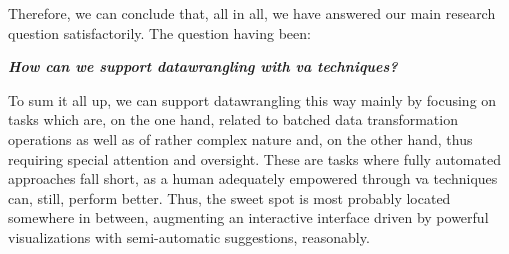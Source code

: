 Therefore, we can conclude that, all in all, we have answered our main research question satisfactorily.
The question having been:

\emph{\textbf{How can we support \gls{datawrangling} with \gls{va} techniques?}}

To sum it all up, we can support \gls{datawrangling} this way mainly by focusing on tasks which are, on the one hand, related to batched data transformation operations as well as of rather complex nature and, on the other hand, thus requiring special attention and oversight.
These are tasks where fully automated approaches fall short, as a human adequately empowered through \gls{va} techniques can, still, perform better.
Thus, the sweet spot is most probably located somewhere in between, augmenting an interactive interface driven by powerful visualizations with semi-automatic suggestions, reasonably.
